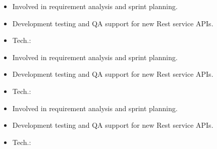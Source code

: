 \documentclass[9pt,a4paper,ragged2e,withhyper]{altacv}
\begin{document}
\begin{paracol}{2}
\divider

\begin{itemize}
\item Involved in requirement analysis and sprint planning.
\item Development testing and QA support for new Rest service APIs.
\item Tech.:    
\end{itemize}

\divider

\begin{itemize}
  \item Involved in requirement analysis and sprint planning.
  \item Development testing and QA support for new Rest service APIs.
  \item Tech.:    
\end{itemize}

\divider

\begin{itemize}
  \item Involved in requirement analysis and sprint planning.
  \item Development testing and QA support for new Rest service APIs.
\item Tech.:     
\end{itemize}






\end{paracol}
\end{document}
